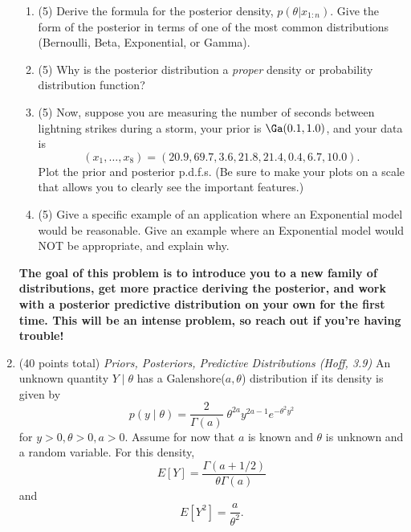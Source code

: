 \documentclass{article}
\begin{document}
\begin{enumerate}
\begin{enumerate}
\item (5) Derive the formula for the posterior density, $p(\theta|x_{1:n})$. Give the form of the posterior in terms of one of the most common distributions (Bernoulli, Beta, Exponential, or Gamma).
\item (5) Why is the posterior distribution a \emph{proper} density or probability distribution function? 
\item (5) Now, suppose you are measuring the number of seconds between lightning strikes during a storm, your prior is $\Ga(0.1,1.0)$, and your data is
$$(x_1,\dotsc,x_8) = (20.9, 69.7, 3.6, 21.8, 21.4, 0.4, 6.7, 10.0).$$
Plot the prior and posterior p.d.f.s. (Be sure to make your plots on a scale that allows you to clearly see the important features.)
\item (5) Give a specific example of an application where an Exponential model would be reasonable. Give an example where an Exponential model would NOT be appropriate, and explain why.
\end{enumerate}

\newpage
\textbf{The goal of this problem is to introduce you to a new family of distributions, get more practice deriving the posterior, and work with a posterior predictive distribution on your own for the first time. This will be an intense problem, so reach out if you're having trouble!}  
\item (40 points total) {\em Priors, Posteriors, Predictive Distributions (Hoff, 3.9)}
An unknown quantity $Y \mid \theta $ has a Galenshore($a, \theta$) distribution if its density is given by 
$$p(y \mid \theta) = \frac{2}{\Gamma(a)} \; \theta^{2a} y^{2a - 1} e^{-\theta^2 y^2}$$
for $y>0, \theta >0, a>0.$ Assume for now that $a$ is known and $\theta$ is unknown and a random variable. For this density, 
$$E[Y] = \frac{\Gamma(a +1/2)}{\theta \Gamma(a)}$$ and 
$$E[Y^2] = \frac{a}{\theta^2}.$$


\end{enumerate}
\end{document}
